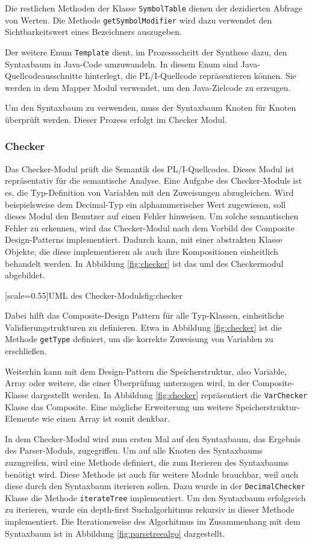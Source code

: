 Die restlichen Methoden der Klasse \verb+SymbolTable+ dienen der dezidierten Abfrage von Werten. Die Methode \verb+getSymbolModifier+ wird dazu verwendet den Sichtbarkeitswert eines Bezeichners auszugeben.

Der weitere Enum \verb+Template+ dient, im Prozessschritt der Synthese dazu, den Syntaxbaum in Java-Code umzuwandeln.
In diesem Enum sind Java-Quellcodeausschnitte hinterlegt, die PL/I-Quellcode repräsentieren können. Sie werden in dem Mapper Modul verwendet, um den Java-Zielcode zu erzeugen.

Um den Syntaxbaum zu verwenden, muss der Syntaxbaum Knoten für Knoten überprüft werden. Dieser Prozess erfolgt im Checker Modul.
 
\subsubsection{Checker}
Das Checker-Modul prüft die Semantik des PL/I-Quellcodes.
Dieses Modul ist repräsentativ für die semantische Analyse. 
Eine Aufgabe des Checker-Moduls ist es, die Typ-Definition von Variablen mit den Zuweisungen abzugleichen.
Wird beispielsweise dem Decimal-Typ ein alphanumerischer Wert zugewiesen, soll dieses Modul den Benutzer auf einen Fehler hinweisen. Um solche semantischen Fehler zu erkennen, wird das Checker-Modul nach dem Vorbild des Composite Design-Patterns implementiert. Dadurch kann, mit einer abstrakten Klasse Objekte, die diese implementieren als auch ihre Kompositionen einheitlich behandelt werden.
In Abbildung \ref{fig:checker} ist das \ac{uml} des Checkermodul abgebildet.

[scale=0.55]{UML des Checker-Moduls}{fig:checker}

Dabei hilft das Composite-Design Pattern für alle Typ-Klassen, einheitliche Validierungstrukturen zu definieren.
Etwa in Abbildung \ref{fig:checker} ist die Methode \verb+getType+ definiert, um die korrekte Zuweisung von Variablen zu erschließen. 

Weiterhin kann mit dem Design-Pattern die Speicherstruktur, also Variable, Array oder weitere, die einer Überprüfung unterzogen wird, in der Composite-Klasse dargestellt werden.
In Abbildung \ref{fig:checker} repräsentiert die \verb+VarChecker+ Klasse das Composite.
Eine mögliche Erweiterung um weitere Speicherstruktur-Elemente wie einen Array ist somit denkbar.

In dem Checker-Modul wird zum ersten Mal auf den Syntaxbaum, das Ergebnis des Parser-Moduls, zugegriffen.
Um auf alle Knoten des Syntaxbaums zuzugreifen, wird eine Methode definiert, die zum Iterieren des Syntaxbaums benötigt wird.
Diese Methode ist auch für weitere Module brauchbar, weil auch diese durch den Syntaxbaum iterieren sollen.
Dazu wurde in der \verb+DecimalChecker+ Klasse die Methode \verb+iterateTree+ implementiert.
Um den Syntaxbaum erfolgreich zu iterieren, wurde ein depth-first Suchalgorhitmus rekursiv in dieser Methode implementiert.
Die Iterationsweise des Algorhitmus im Zusammenhang mit dem Syntaxbaum ist in Abbildung \ref{fig:parsetreealgo} dargestellt.

